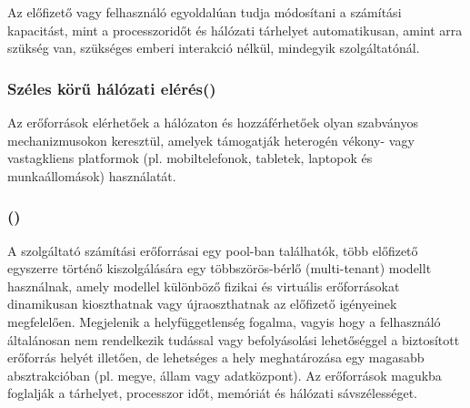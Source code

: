 Az előfizető vagy felhasználó egyoldalúan tudja módosítani a számítási kapacitást, mint a processzoridőt és hálózati tárhelyet automatikusan, amint arra szükség van, szükséges emberi interakció nélkül, mindegyik szolgáltatónál.

\subsubsection{Széles körű hálózati elérés()}

Az erőforrások elérhetőek a hálózaton és hozzáférhetőek olyan szabványos mechanizmusokon keresztül, amelyek támogatják heterogén vékony- vagy vastagkliens platformok (pl. mobiltelefonok, tabletek, laptopok és munkaállomások) használatát.

\subsubsection{()}

A szolgáltató számítási erőforrásai egy pool-ban  találhatók, több előfizető egyszerre történő kiszolgálására egy többszörös-bérlő (multi-tenant) modellt használnak, amely modellel különböző fizikai és virtuális erőforrásokat dinamikusan kioszthatnak vagy újraoszthatnak az előfizető igényeinek megfelelően. Megjelenik a helyfüggetlenség fogalma, vagyis hogy a felhasználó általánosan nem rendelkezik tudással vagy befolyásolási lehetőséggel a biztosított erőforrás helyét illetően, de lehetséges a hely meghatározása egy magasabb absztrakcióban (pl. megye, állam vagy adatközpont). Az erőforrások magukba foglalják a tárhelyet, processzor időt, memóriát és hálózati sávszélességet.

